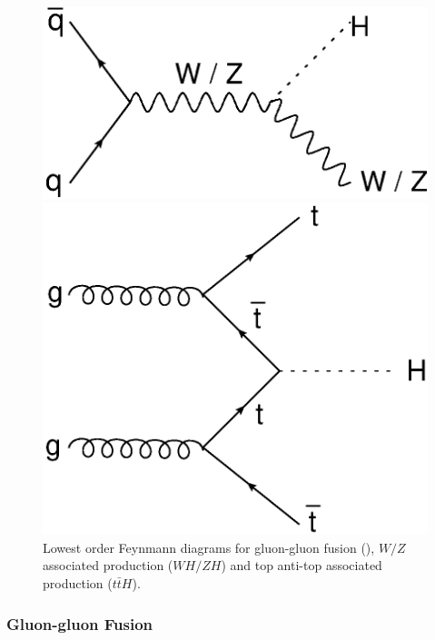 			\begin{figure}[h]
				\centering
					\begin{minipage}[h]{0.4\linewidth}
						\includegraphics[width=1\linewidth]{T/FIGS/whzh}
					\end{minipage}
					\quad\quad
					\begin{minipage}[h]{0.4\linewidth}
						\includegraphics[width=1\linewidth]{T/FIGS/tth}
					\end{minipage}
				\caption{Lowest order Feynmann diagrams for gluon-gluon fusion (\ggF), $W/Z$ associated production ($WH/ZH$) and top anti-top associated production ($t\bar{t}H$).}
				\label{fig:higgsproddiag}
			\end{figure}


		\subsubsection{Gluon-gluon Fusion}

